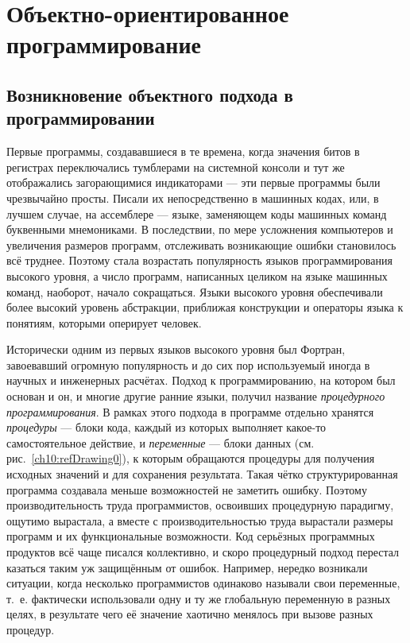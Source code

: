 \renewcommand{\arraystretch}{0.5}
\chapter{Объектно-ориентированное программирование}%
\section{Возникновение объектного подхода в программировании}
Первые программы, создававшиеся в те времена, когда значения битов в регистрах переключались тумблерами на системной
консоли и тут же отображались загорающимися индикаторами --- эти первые программы были чрезвычайно просты. Писали их
непосредственно в машинных кодах, или, в лучшем случае, на ассемблере --- языке, заменяющем коды машинных команд
буквенными мнемониками. В последствии, по мере усложнения компьютеров и увеличения размеров программ, отслеживать
возникающие ошибки становилось всё труднее. Поэтому стала возрастать популярность языков программирования высокого
уровня, а число программ, написанных целиком на языке машинных команд, наоборот, начало сокращаться. Языки высокого
уровня обеспечивали более высокий уровень абстракции, приближая конструкции и операторы языка к понятиям, которыми
оперирует человек.

Исторически одним из первых языков высокого уровня был Фортран, завоевавший огромную популярность и до сих пор
используемый иногда в научных и инженерных расчётах. Подход к программированию, на котором был основан и он, и многие
другие ранние языки, получил название \emph{процедурного программирования}. В рамках этого подхода в
программе отдельно хранятся \emph{процедуры} --- блоки кода, каждый из которых выполняет какое-то
самостоятельное действие, и \emph{переменные} --- блоки данных (см. рис.~\ref{ch10:refDrawing0}), к которым
обращаются процедуры для получения исходных значений и для сохранения результата. Такая чётко структурированная
программа создавала меньше возможностей не заметить ошибку. Поэтому производительность труда программистов, освоивших
процедурную парадигму, ощутимо вырастала, а вместе с производительностью труда вырастали размеры программ и их
функциональные возможности. Код серьёзных программных продуктов всё чаще писался коллективно, и скоро процедурный
подход перестал казаться таким уж защищённым от ошибок. Например, нередко возникали ситуации, когда несколько
программистов одинаково называли свои переменные, т.~е. фактически использовали одну и ту же глобальную переменную в
разных целях, в результате чего её значение хаотично менялось при вызове разных процедур. 

